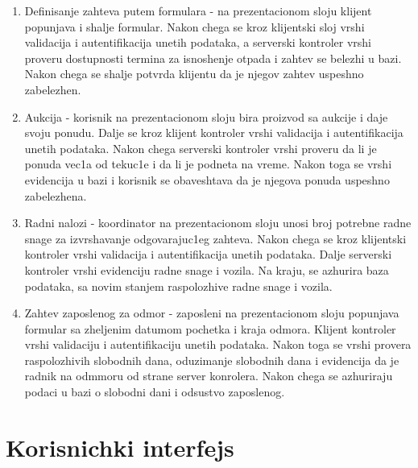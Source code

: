 \documentclass[10 pt]{article}
\begin{document}
		\begin{enumerate}
			\item Definisanje zahteva putem formulara - na prezentacionom sloju klijent popunjava i shalje formular. Nakon chega se kroz klijentski sloj vrshi validacija i autentifikacija unetih podataka, a serverski kontroler vrshi proveru dostupnosti termina za isnoshenje otpada i zahtev se belezhi u bazi. Nakon chega se shalje potvrda klijentu da je njegov zahtev uspeshno zabelezhen.
			
			\item Aukcija - korisnik na prezentacionom sloju bira proizvod sa aukcije i daje svoju ponudu. Dalje se kroz klijent kontroler vrshi validacija i autentifikacija unetih podataka. Nakon chega serverski kontroler vrshi proveru da li je ponuda vec1a od tekuc1e i da li je podneta na vreme. Nakon toga se vrshi evidencija u bazi i korisnik se obaveshtava da je njegova ponuda uspeshno zabelezhena.
			
			\item Radni nalozi - koordinator na prezentacionom sloju unosi broj potrebne radne snage za izvrshavanje odgovarajuc1eg zahteva. Nakon chega se kroz klijent{s}ki kontroler vrshi validacija i autentifikacija unetih podataka. Dalje serverski kontroler vrshi evidenciju radne snage i vozila. Na kraju, se azhurira baza podataka, sa novim stanjem raspolozhive radne snage i vozila.
			
			\item Zahtev zaposlenog za odmor - zaposleni na prezentacionom sloju popunjava formular sa zheljenim datumom pochetka i kraja odmora. Klijent kontroler vrshi validaciju i autentifikaciju unetih podataka. Nakon toga se vrshi provera raspolozhivih slobodnih dana, oduzimanje slobodnih dana i evidencija da je radnik na odmmoru od strane server konrolera. Nakon chega se azhuriraju podaci u bazi o slobodni dani i odsustvo zaposlenog.
			
		\end{enumerate}
	
	
	\section{Korisnichki interfejs}
	
	
\end{document}

